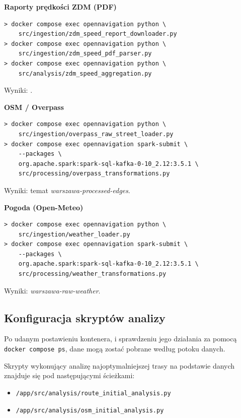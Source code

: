 \documentclass[12pt]{article}
\begin{document}
\par\medskip
\textbf{Raporty prędkości ZDM (PDF)}
\begin{tcolorbox}
\begin{verbatim}
> docker compose exec opennavigation python \
    src/ingestion/zdm_speed_report_downloader.py
> docker compose exec opennavigation python \
    src/ingestion/zdm_speed_pdf_parser.py
> docker compose exec opennavigation python \
    src/analysis/zdm_speed_aggregation.py
\end{verbatim}
\end{tcolorbox}
Wyniki: .

\par\medskip
\textbf{OSM / Overpass}
\begin{tcolorbox}
\begin{verbatim}
> docker compose exec opennavigation python \
    src/ingestion/overpass_raw_street_loader.py
> docker compose exec opennavigation spark-submit \
    --packages \
    org.apache.spark:spark-sql-kafka-0-10_2.12:3.5.1 \
    src/processing/overpass_transformations.py
\end{verbatim}
\end{tcolorbox}
Wyniki: temat \textit{warszawa-processed-edges}.

\par\medskip
\textbf{Pogoda (Open-Meteo)}
\begin{tcolorbox}
\begin{verbatim}
> docker compose exec opennavigation python \
    src/ingestion/weather_loader.py
> docker compose exec opennavigation spark-submit \
    --packages \
    org.apache.spark:spark-sql-kafka-0-10_2.12:3.5.1 \
    src/processing/weather_transformations.py
\end{verbatim}
\end{tcolorbox}
Wyniki: \textit{warszawa-raw-weather}.

\subsection{Konfiguracja skryptów analizy}

Po udanym postawieniu kontenera, i sprawdzeniu jego działania za pomocą \verb|docker compose ps|, dane 
mogą zostać pobrane według potoku danych.

Skrypty wykonujący analizę najoptymalniejszej trasy na podstawie danych znajduje się pod następującymi ścieżkami:
\begin{itemize}
\item \verb|/app/src/analysis/route_initial_analysis.py|
\item \verb|/app/src/analysis/osm_initial_analysis.py|
\end{itemize}
\end{document}
